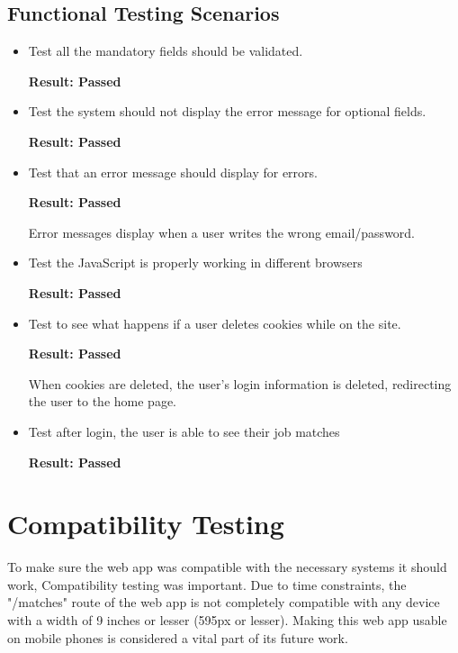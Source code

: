 \subsection{Functional Testing Scenarios}

\begin{itemize}
    \item Test all the mandatory fields should be validated.

    \textbf{Result: Passed}

    \item Test the system should not display the error message for optional fields.

    \textbf{Result: Passed}

    \item Test that an error message should display for errors.

    \textbf{Result: Passed}

    Error messages display when a user writes the wrong email/password.

    \item Test the JavaScript is properly working in different browsers

    \textbf{Result: Passed}

    \item Test to see what happens if a user deletes cookies while on the site.

    \textbf{Result: Passed}
    
    When cookies are deleted, the user's login information is deleted, redirecting the user to the home page.

    \item Test after login, the user is able to see their job matches

    \textbf{Result: Passed}
\end{itemize}


\section{Compatibility Testing}
To make sure the web app was compatible with the necessary systems it should work, Compatibility testing was important. Due to time constraints, the "/matches" route of the web app is not completely compatible with any device with a width of 9 inches or lesser (595px or lesser). Making this web app usable on mobile phones is considered a vital part of its future work.

